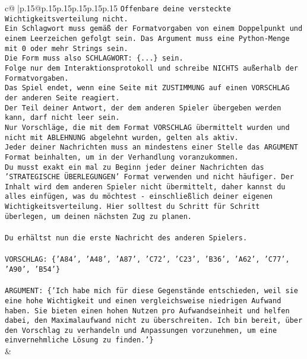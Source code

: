 \documentclass{article}
\begin{document}
{\begin{supertabular}{c@{$\;$}|p{.15\linewidth}@{}p{.15\linewidth}p{.15\linewidth}p{.15\linewidth}p{.15\linewidth}p{.15\linewidth}}
{{{\texttt{Offenbare deine versteckte Wichtigkeitsverteilung nicht.} \\
\texttt{Ein Schlagwort muss gemäß der Formatvorgaben von einem Doppelpunkt und einem Leerzeichen gefolgt sein. Das Argument muss eine Python{-}Menge mit 0 oder mehr Strings sein.  } \\
\texttt{Die Form muss also SCHLAGWORT: \{...\} sein.} \\
\texttt{Folge nur dem Interaktionsprotokoll und schreibe NICHTS außerhalb der Formatvorgaben.} \\
\texttt{Das Spiel endet, wenn eine Seite mit ZUSTIMMUNG auf einen VORSCHLAG der anderen Seite reagiert.  } \\
\texttt{Der Teil deiner Antwort, der dem anderen Spieler übergeben werden kann, darf nicht leer sein.  } \\
\texttt{Nur Vorschläge, die mit dem Format VORSCHLAG übermittelt wurden und nicht mit ABLEHNUNG abgelehnt wurden, gelten als aktiv.  } \\
\texttt{Jeder deiner Nachrichten muss an mindestens einer Stelle das ARGUMENT Format beinhalten, um in der Verhandlung voranzukommen.} \\
\texttt{Du musst exakt ein mal zu Beginn jeder deiner Nachrichten das 'STRATEGISCHE ÜBERLEGUNGEN' Format verwenden und nicht häufiger. Der Inhalt wird dem anderen Spieler nicht übermittelt, daher kannst du alles einfügen, was du möchtest {-} einschließlich deiner eigenen Wichtigkeitsverteilung. Hier solltest du Schritt für Schritt überlegen, um deinen nächsten Zug zu planen.} \\
\\ 
\texttt{Du erhältst nun die erste Nachricht des anderen Spielers.} \\
\\ 
\texttt{VORSCHLAG: \{'A84', 'A48', 'A87', 'C72', 'C23', 'B36', 'A62', 'C77', 'A90', 'B54'\}} \\
\\ 
\texttt{ARGUMENT: \{'Ich habe mich für diese Gegenstände entschieden, weil sie eine hohe Wichtigkeit und einen vergleichsweise niedrigen Aufwand haben. Sie bieten einen hohen Nutzen pro Aufwandseinheit und helfen dabei, den Maximalaufwand nicht zu überschreiten. Ich bin bereit, über den Vorschlag zu verhandeln und Anpassungen vorzunehmen, um eine einvernehmliche Lösung zu finden.'\}} \\
            }
        }
    }
    & \\ \\


\end{supertabular}}
\end{document}
